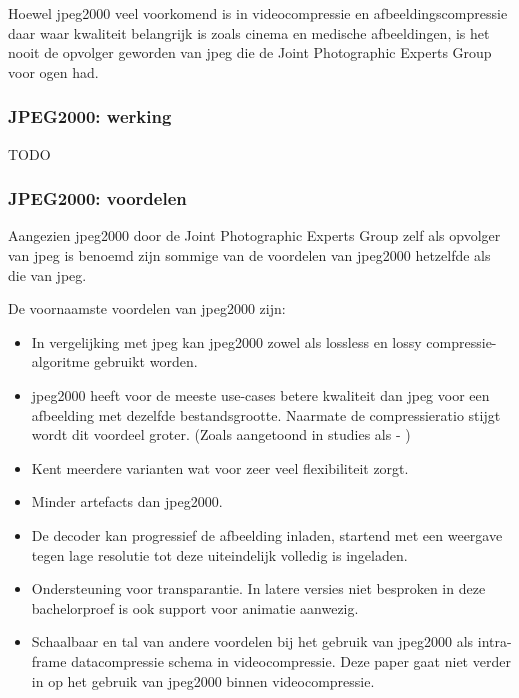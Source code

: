 Hoewel \gls{jpeg2000} veel voorkomend is in \gls{videocompressie} en \gls{afbeeldingscompressie} daar waar kwaliteit belangrijk is zoals cinema en medische afbeeldingen, is het nooit de opvolger geworden van \gls{jpeg} die de Joint Photographic Experts Group voor ogen had.


\subsubsection{JPEG2000: werking}
\label{sec:afbeeldingscompressie-jpeg2000-werking}

TODO


\subsubsection{JPEG2000: voordelen}
\label{sec:afbeeldingscompressie-jpeg2000-voordelen}

Aangezien \gls{jpeg2000} door de Joint Photographic Experts Group zelf als opvolger van \gls{jpeg} is benoemd zijn sommige van de voordelen van \gls{jpeg2000} hetzelfde als die van \gls{jpeg}.

De voornaamste voordelen van \gls{jpeg2000} zijn:

\begin{itemize}
	\item In vergelijking met \gls{jpeg} kan \gls{jpeg2000} zowel als \gls{lossless} en \gls{lossy} \gls{compressie-algoritme} gebruikt worden.
	
	\item \gls{jpeg2000} heeft voor de meeste \glspl{use-case} betere kwaliteit dan \gls{jpeg} voor een afbeelding met dezelfde bestandsgrootte. Naarmate de compressieratio stijgt wordt dit voordeel groter. (Zoals aangetoond in studies als  - \cite{jpegvsjpeg2000quality})
	
	\item Kent meerdere varianten wat voor zeer veel flexibiliteit zorgt.
	
	\item Minder \glspl{artefact} dan \gls{jpeg2000}.
	
	\item De  \gls{decoder} kan progressief de afbeelding inladen, startend met een weergave tegen lage resolutie tot deze uiteindelijk volledig is ingeladen.
	
	\item Ondersteuning voor transparantie. In latere versies niet besproken in deze bachelorproef is ook support voor animatie aanwezig.
	
	\item Schaalbaar en tal van andere voordelen bij het gebruik van \gls{jpeg2000} als \gls{intra-frame} \gls{datacompressie} schema in \gls{videocompressie}. Deze paper gaat niet verder in op het gebruik van \gls{jpeg2000} binnen \gls{videocompressie}.
\end{itemize}

